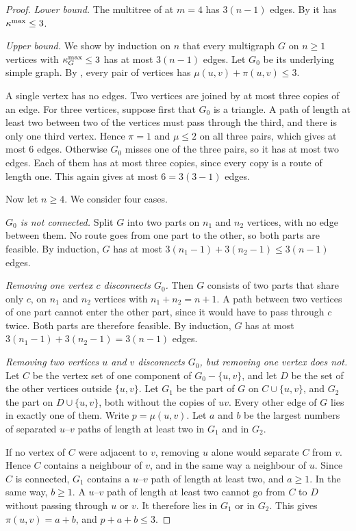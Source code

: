 \begin{proof}
\emph{Lower bound.} The multitree of  at $m=4$ has $3(n-1)$ edges. By  it has $\kappa^{\max}\le3$.

\emph{Upper bound.} We show by induction on $n$ that every multigraph $G$ on $n\ge1$ vertices with $\kappa^{\max}_G\le3$ has at most $3(n-1)$ edges.
Let $G_0$ be its underlying simple graph.
By , every pair of vertices has $\mu(u,v)+\pi(u,v)\le3$.

A single vertex has no edges.
Two vertices are joined by at most three copies of an edge.
For three vertices, suppose first that $G_0$ is a triangle.
A path of length at least two between two of the vertices must pass through the third, and there is only one third vertex.
Hence $\pi=1$ and $\mu\le2$ on all three pairs, which gives at most $6$ edges.
Otherwise $G_0$ misses one of the three pairs, so it has at most two edges.
Each of them has at most three copies, since every copy is a route of length one.
This again gives at most $6=3(3-1)$ edges.

Now let $n\ge4$. We consider four cases.

\emph{$G_0$ is not connected.} Split $G$ into two parts on $n_1$ and $n_2$ vertices, with no edge between them.
No route goes from one part to the other, so both parts are feasible.
By induction, $G$ has at most $3(n_1-1)+3(n_2-1)\le3(n-1)$ edges.

\emph{Removing one vertex $c$ disconnects $G_0$.} Then $G$ consists of two parts that share only $c$, on $n_1$ and $n_2$ vertices with $n_1+n_2=n+1$.
A path between two vertices of one part cannot enter the other part, since it would have to pass through $c$ twice.
Both parts are therefore feasible.
By induction, $G$ has at most $3(n_1-1)+3(n_2-1)=3(n-1)$ edges.

\emph{Removing two vertices $u$ and $v$ disconnects $G_0$, but removing one vertex does not.}
Let $C$ be the vertex set of one component of $G_0-\{u,v\}$, and let $D$ be the set of the other vertices outside $\{u,v\}$.
Let $G_1$ be the part of $G$ on $C\cup\{u,v\}$, and $G_2$ the part on $D\cup\{u,v\}$, both without the copies of $uv$.
Every other edge of $G$ lies in exactly one of them.
Write $p=\mu(u,v)$.
Let $a$ and $b$ be the largest numbers of separated $u$--$v$ paths of length at least two in $G_1$ and in $G_2$.

If no vertex of $C$ were adjacent to $v$, removing $u$ alone would separate $C$ from $v$.
Hence $C$ contains a neighbour of $v$, and in the same way a neighbour of $u$.
Since $C$ is connected, $G_1$ contains a $u$--$v$ path of length at least two, and $a\ge1$.
In the same way, $b\ge1$.
A $u$--$v$ path of length at least two cannot go from $C$ to $D$ without passing through $u$ or $v$.
It therefore lies in $G_1$ or in $G_2$.
This gives $\pi(u,v)=a+b$, and $p+a+b\le3$.


\end{proof}

